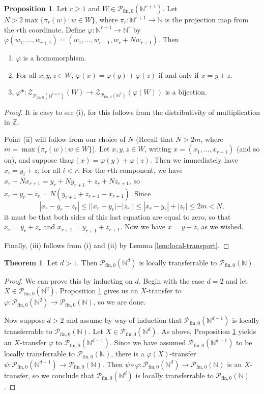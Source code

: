 \documentclass{report}
\newcommand{\NN}{\mathbb{N}}
\renewcommand{\P}{\mathcal{P}}
\newcommand{\ZZ}{\mathbb{Z}}
\newcommand{\Z}{\mathcal{Z}}
\newcommand{\fin}{\textrm{fin}}
\newcommand{\fon}{{\textrm{fin}, 0}}
\renewcommand{\:}{\text{:}}
\newcommand{\PN}{{\P_{\fin,0}(\NN)}}
\theoremstyle{definition}
\newtheorem{prop}[defn]{Proposition}
\newtheorem{thm}[defn]{Theorem}
\begin{document}
\begin{prop}\label{prop:flattening}
Let $r \ge 1$ and $W\in \P_\fon(\NN^{r+1})$.
Let $N > 2 \max\{\pi_r(w): w\in W\}$, where $\pi_r: \NN^{r+1} \to \NN$ is the projection map from the $r$th coordinate.
Define $\varphi: \NN^{r+1} \to \NN^r$ by $\varphi(w_1,\dots, w_{r+1}) = (w_1,\dots, w_{r-1},w_r + N w_{r+1})$.
Then
\begin{enumerate}[label={\rm (\roman{*})}]
	\item $\varphi$ is a homomorphism.
	\item For all $x,y,z\in W$, $\varphi(x) = \varphi(y) + \varphi(z)$ if and only if $x = y + z$.
	\item $\varphi*:\Z_{\P_\fon(\NN^{r+1})}(W) \to \Z_{\P_\fon(\NN^r)}(\varphi(W))$ is a bijection.
\end{enumerate}
\end{prop}
\begin{proof}
It is easy to see (i), for this follows from the distributivity of multiplication in $\ZZ$.

Point (ii) will follow from our choice of $N$ (Recall that $N > 2m$, where $m = \max\{\pi_r(w): w\in W\}$).
Let $x,y,z\in W$, writing $x = (x_1,\dots, x_{r+1})$ (and so on), and suppose tha$\varphi(x) = \varphi(y) + \varphi(z)$.
Then we immediately have $x_i = y_i + z_i$ for all $i < r$.
For the $r$th component, we have $x_r + Nx_{r+1} = y_r + Ny_{r+1} + z_r + Nz_{r+1}$, so
$x_r -y_r - z_r = N(y_{r+1}+z_{r+1}-x_{r+1})$.
Since 
\[|x_r - y_r - z_r| \le | |x_r - y_r| - |z_r| | \le |x_r-y_r| + |z_r| \le 2m < N,\]
it must be that both sides of this last equation are equal to zero, so that $x_r = y_r + z_r$ and $x_{r+1} = y_{r+1}+z_{r+1}$.
Now we have $x = y+z$, as we wished.

Finally, (iii) follows from (i) and (ii) by Lemma \ref{lem:local-transport}.
\end{proof}

\begin{thm}\label{thm:passage-to-Nd}
Let $d > 1$. 
Then $\P_\fon(\NN^d)$ is locally transferrable to $\PN$.
\end{thm}
\begin{proof}
We can prove this by inducting on $d$.
Begin with the case $d=2$ and let $X\in \P_\fon(\NN^2)$.
Proposition \ref{prop:flattening} gives us an $X$-transfer to $\varphi:\P_\fon(\NN^2) \to \PN$, so we are done.

Now suppose $d>2$ and assume by way of induction that $\P_\fon(\NN^{d-1})$ is locally transferrable to $\PN$.
Let $X\in \P_\fon(\NN^{d})$.
As above, Proposition \ref{prop:flattening} yields an $X$-transfer $\varphi$ to $\P_\fon(\NN^{d-1})$.
Since we have assumed $\P_\fon(\NN^{d-1})$ to be locally transferrable to $\PN$, there is a $\varphi(X)$-transfer $\psi: \P_\fon(\NN^{d-1}) \to \PN$.
Then $\psi\circ\varphi: \P_\fon(\NN^d) \to \PN$ is an $X$-transfer, so we conclude that $\P_\fon(\NN^d)$ is locally transferrable to $\PN$.
\end{proof}
\end{document}
